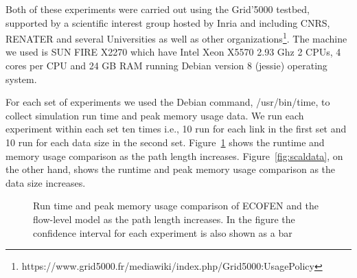 Both of these experiments were carried out using the Grid'5000 testbed, supported by a scientific interest group hosted by Inria and including CNRS, RENATER and several Universities as well as other organizations\footnote{https://www.grid5000.fr/mediawiki/index.php/Grid5000:UsagePolicy}. The machine we used is SUN FIRE X2270 which have Intel Xeon X5570 2.93 Ghz 2 CPUs, 4 cores per CPU and 24 GB RAM running Debian version 8 (jessie) operating system.

For each set of experiments we used the Debian command, /usr/bin/time, to collect simulation run time and peak memory usage data. We run each experiment within each set ten times i.e., 10 run for each link in the first set and 10 run for each data size in the second set. Figure~\ref{fig:scallinks} shows the runtime and memory usage comparison as the path length increases. Figure~\ref{fig:scaldata}, on the other hand, shows the runtime and peak memory usage comparison as the data size increases.

\begin{figure}[ht]
	\centering
	\centering
	\caption{Run time and peak memory usage comparison of ECOFEN and the flow-level model as the path length increases. In the figure the confidence interval for each experiment is also shown as a bar}
	\label{fig:scallinks}
\end{figure}

